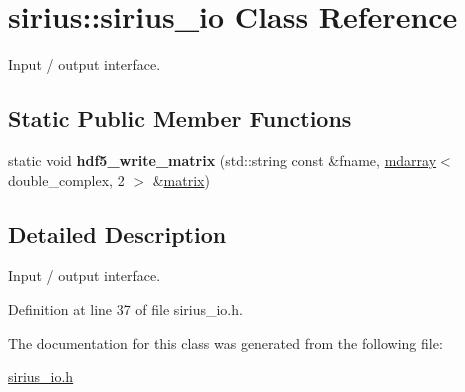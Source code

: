 \hypertarget{classsirius_1_1sirius__io}{}\section{sirius\+:\+:sirius\+\_\+io Class Reference}
\label{classsirius_1_1sirius__io}


Input / output interface.  


\subsection*{Static Public Member Functions}
\begin{DoxyCompactItemize}
\item 
\hypertarget{classsirius_1_1sirius__io_a2a5fb0629351e845f4a8bf5f58d1fdb0}{}static void {\bfseries hdf5\+\_\+write\+\_\+matrix} (std\+::string const \&fname, \hyperlink{classsddk_1_1mdarray}{mdarray}$<$ double\+\_\+complex, 2 $>$ \&\hyperlink{classsddk_1_1mdarray}{matrix})\label{classsirius_1_1sirius__io_a2a5fb0629351e845f4a8bf5f58d1fdb0}

\end{DoxyCompactItemize}


\subsection{Detailed Description}
Input / output interface. 

Definition at line 37 of file sirius\+\_\+io.\+h.



The documentation for this class was generated from the following file\+:\begin{DoxyCompactItemize}
\item 
\hyperlink{sirius__io_8h}{sirius\+\_\+io.\+h}\end{DoxyCompactItemize}
